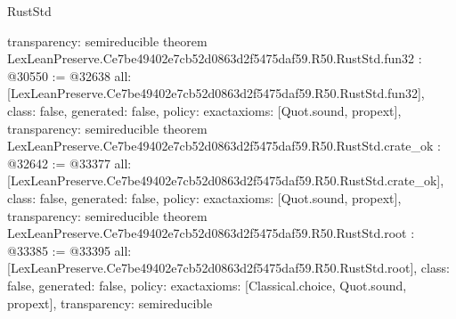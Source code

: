 \begin{lexlean}{RustStd}
\begin{coremodule}
{  transparency: semireducible
}
theorem LexLeanPreserve.Ce7be49402e7cb52d0863d2f5475daf59.R50.RustStd.fun32 : @30550 := @32638 {
  all: [LexLeanPreserve.Ce7be49402e7cb52d0863d2f5475daf59.R50.RustStd.fun32],
  class: false,
  generated: false,
  policy: exact{axioms: [Quot.sound, propext]},
  transparency: semireducible
}
theorem LexLeanPreserve.Ce7be49402e7cb52d0863d2f5475daf59.R50.RustStd.crate_ok : @32642 := @33377 {
  all: [LexLeanPreserve.Ce7be49402e7cb52d0863d2f5475daf59.R50.RustStd.crate_ok],
  class: false,
  generated: false,
  policy: exact{axioms: [Quot.sound, propext]},
  transparency: semireducible
}
theorem LexLeanPreserve.Ce7be49402e7cb52d0863d2f5475daf59.R50.RustStd.root : @33385 := @33395 {
  all: [LexLeanPreserve.Ce7be49402e7cb52d0863d2f5475daf59.R50.RustStd.root],
  class: false,
  generated: false,
  policy: exact{axioms: [Classical.choice, Quot.sound, propext]},
  transparency: semireducible
}


\end{coremodule}
\end{lexlean}
